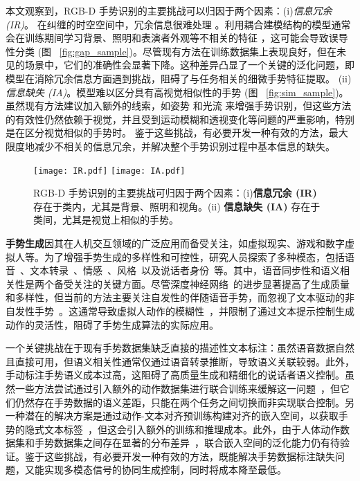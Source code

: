 本文观察到，RGB-D 手势识别的主要挑战可以归因于两个因素：(i)\textit{信息冗余 (IR)}。
在纠缠的时空空间中，冗余信息很难处理 \cite{zhou2023unified, LI2024110536}。利用耦合建模结构的模型通常会在训练期间学习背景、照明和表演者外观等不相关的特征 \cite{zhou2023unified}，这可能会导致误导性分类 (图 ~\ref{fig:gap_sample})。尽管现有方法在训练数据集上表现良好，但在未见的场景中，它们的准确性会显著下降。这种差异凸显了一个关键的泛化问题，即模型在消除冗余信息方面遇到挑战，阻碍了与任务相关的细微手势特征提取。
(ii)\textit{信息缺失 (IA)}。模型难以区分具有高视觉相似性的手势 (图 ~\ref{fig:sim_sample})。虽然现有方法建议加入额外的线索，如姿势 \cite{wan2016chalearn,zuo2023natural} 和光流 \cite{narayana2018focus} 来增强手势识别，但这些方法的有效性仍然依赖于视觉，并且受到运动模糊和透视变化等问题的严重影响，特别是在区分视觉相似的手势时。
鉴于这些挑战，有必要开发一种有效的方法，最大限度地减少不相关的信息冗余，并解决整个手势识别过程中基本信息的缺失。

\begin{figure}[tb]
  \centering
  {\texttt{[image: IR.pdf]}}
  {\texttt{[image: IA.pdf]}}
  \caption{RGB-D 手势识别的主要挑战可归因于两个因素：(i)\textbf{信息冗余 (IR)} 存在于类内，尤其是背景、照明和视角。(ii) \textbf{信息缺失 (IA)} 存在于类间，尤其是视觉上相似的手势。}
  \label{fig:samples}
  \end{figure}


\textbf{手势生成}因其在人机交互领域的广泛应用而备受关注，如虚拟现实、游戏和数字虚拟人等。为了增强手势生成的多样性和可控性，研究人员探索了多种模态，包括语音~\cite{yang2023diffusestylegesture, yang2023unifiedgesture,xu2025mambatalk}、文本转录~\cite{zhi2023livelyspeaker, pang2023bodyformer,liu2024emage}、情感~\cite{qi2024emotiongesture, qi2024weakly}、风格~\cite{ao2023gesturediffuclip, yang2023diffusestylegesture, ghorbani2023zeroeggs}以及说话者身份~\cite{yang2023diffusestylegesture+}等。其中，语音同步性和语义相关性是两个备受关注的关键方面。尽管深度神经网络~\cite{liu2024emage, xu2025mambatalk, cheng2024siggesture}的进步显著提高了生成质量和多样性，但当前的方法主要关注自发性的伴随语音手势，而忽视了文本驱动的非自发性手势~\cite{yang2024freetalker}。这通常导致虚拟人动作的模糊性~\cite{chen2024syntalker}，并限制了通过文本提示控制生成动作的灵活性，阻碍了手势生成算法的实际应用。

一个关键挑战在于现有手势数据集缺乏直接的描述性文本标注：虽然语音数据自然且直接可用，但语义相关性通常仅通过语音转录推断，导致语义关联较弱。此外，手动标注手势语义成本过高，这阻碍了高质量生成和精细化的说话者语义控制。虽然一些方法尝试通过引入额外的动作数据集进行联合训练来缓解这一问题~\cite{yang2024freetalker}，但它们仍然存在手势数据的语义差距，只能在两个任务之间切换而非实现联合控制。另一种潜在的解决方案是通过动作-文本对齐预训练构建对齐的嵌入空间，以获取手势的隐式文本标签~\cite{chen2024syntalker}，但这会引入额外的训练和推理成本。此外，由于人体动作数据集和手势数据集之间存在显著的分布差异~\cite{chen2024syntalker}，联合嵌入空间的泛化能力仍有待验证。鉴于这些挑战，有必要开发一种有效的方法，既能解决手势数据标注缺失问题，又能实现多模态信号的协同生成控制，同时将成本降至最低。


